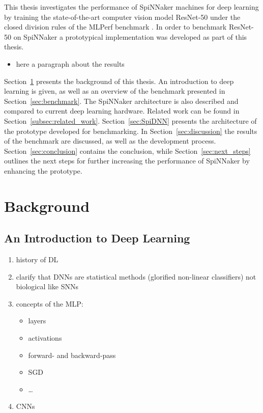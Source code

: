 \documentclass[]{article}
\begin{document}
This thesis investigates the performance of SpiNNaker machines for
deep learning by training the state-of-the-art computer vision model
ResNet-50 under the closed division rules of the MLPerf benchmark
\citep{he_et_al_2015, mattson_et_al_2019}.
In order to benchmark ResNet-50 on SpiNNaker a prototypical
implementation was developed as part of this thesis.

\begin{itemize}
  \item here a paragraph about the results
\end{itemize}

Section~\ref{sec:background} presents the background of this thesis.
An introduction to deep learning is given, as well as an overview
of the benchmark presented in Section~\ref{sec:benchmark}.
The SpiNNaker architecture is also described and compared to
current deep learning hardware.
Related work can be found in Section~\ref{subsec:related_work}.
Section~\ref{sec:SpiDNN} presents the architecture of the
prototype developed for benchmarking.
In Section~\ref{sec:discussion} the results of the benchmark are
discussed, as well as the development process.
Section~\ref{sec:conclusion} contains the conclusion, while
Section~\ref{sec:next_steps} outlines the next steps for further
increasing the performance of SpiNNaker by enhancing the
prototype.


\section{Background} %
\label{sec:background}

\subsection{An Introduction to Deep Learning} %

\begin{enumerate}
  \item history of DL
  \item clarify that DNNs are statistical methods (glorified non-linear
        classifiers) not biological like SNNs
  \item concepts of the MLP:
    \begin{itemize}
      \item layers
      \item activations
      \item forward- and backward-pass
      \item SGD
      \item \dots
    \end{itemize}
  \item CNNs
\end{enumerate}
\end{document}
